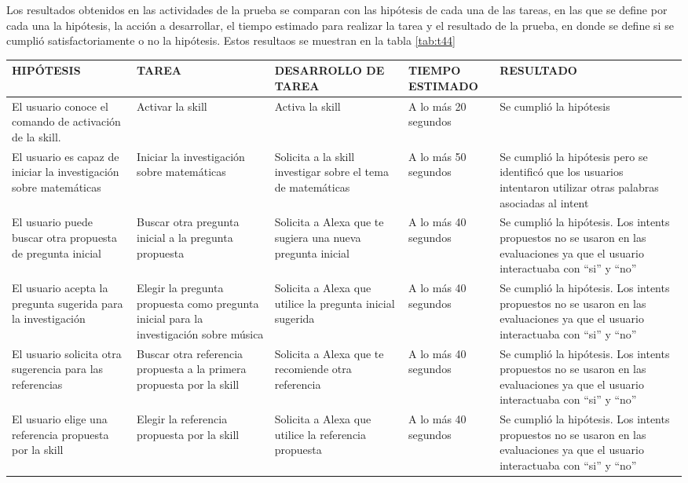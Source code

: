 Los resultados obtenidos en las actividades de la prueba se comparan con las hipótesis de cada una de las tareas, en las que se define por cada una la hipótesis, la acción a desarrollar, el tiempo estimado para realizar la tarea y el resultado de la prueba, en donde se define si se cumplió satisfactoriamente o no la hipótesis. Estos resultaos se muestran en la tabla \ref{tab:t44}

\begin{table}[t]
  \begin{center}
    \begin{tabular}{ | p{3cm} | p{3cm} | p{3cm} | p{2cm} | p{4cm} | }
      \hline
      HIPÓTESIS & TAREA & DESARROLLO DE TAREA & TIEMPO ESTIMADO & RESULTADO \\ \hline
      El usuario conoce el comando de activación de la skill. & Activar la skill & Activa la skill & A lo más 20 segundos & Se cumplió la hipótesis \\ \hline
      El usuario es capaz de iniciar la investigación sobre matemáticas & Iniciar la investigación sobre matemáticas & Solicita a la skill investigar sobre el tema de matemáticas & A lo más 50 segundos & Se cumplió la hipótesis pero se identificó que los usuarios intentaron utilizar otras palabras asociadas al intent \\ \hline
      El usuario puede buscar otra propuesta de pregunta inicial & Buscar otra pregunta inicial a la pregunta propuesta & Solicita a Alexa que te sugiera una nueva pregunta inicial & A lo más 40 segundos & Se cumplió la hipótesis. Los intents propuestos no se usaron en las evaluaciones ya que el usuario interactuaba con “si” y “no” \\ \hline
      El usuario acepta la pregunta sugerida para la investigación & Elegir la pregunta propuesta como pregunta inicial para la investigación sobre música & Solicita a Alexa que utilice la pregunta inicial sugerida & A lo más 40 segundos & Se cumplió la hipótesis. Los intents propuestos no se usaron en las evaluaciones ya que el usuario interactuaba con “si” y “no” \\ \hline
      El usuario solicita otra sugerencia para las referencias & Buscar otra referencia propuesta a la primera propuesta por la skill & Solicita a Alexa que te recomiende otra referencia & A lo más 40 segundos & Se cumplió la hipótesis. Los intents propuestos no se usaron en las evaluaciones ya que el usuario interactuaba con “si” y “no” \\ \hline
      El usuario elige una referencia propuesta por la skill & Elegir la referencia propuesta por la skill & Solicita a Alexa que utilice la referencia propuesta & A lo más 40 segundos & Se cumplió la hipótesis. Los intents propuestos no se usaron en las evaluaciones ya que el usuario interactuaba con “si” y “no” \\ \hline
    \end{tabular}
  \end{center}
\end{table}

